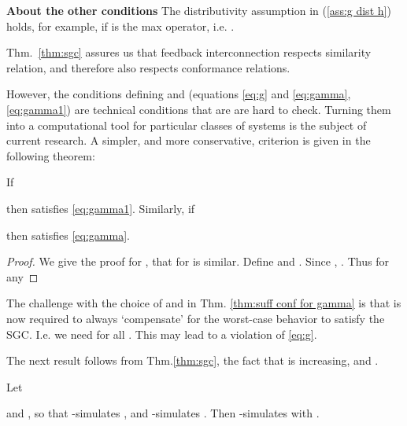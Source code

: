 \textbf{About the other conditions} The distributivity assumption in (\ref{ass:g dist h}) holds, for example, if  is the max operator, i.e. .

Thm.~\ref{thm:sgc} assures us that feedback interconnection respects similarity relation, and therefore also respects conformance relations.

However, the conditions defining  and  (equations \eqref{eq:g} and \eqref{eq:gamma},\eqref{eq:gamma1}) are technical conditions that are are hard to check. 
Turning them into a computational tool for particular classes of systems is the subject of current research.
A simpler, and more conservative, criterion is given in the following theorem:
\begin{theorem}
\label{thm:suff conf for gamma}
If 

then  satisfies \eqref{eq:gamma1}.
Similarly, if 

then  satisfies \eqref{eq:gamma}.
\exmend
\end{theorem}
\begin{proof}
	We give the proof for , that for  is similar.
	Define  
	and .
	Since , .
	Thus for any 
	
\end{proof}
The challenge with the choice of  and  in Thm. \ref{thm:suff conf for gamma} is that  is now required to always `compensate' for the worst-case behavior to satisfy the SGC. 
I.e. we need  for all .
This may lead to a violation of \eqref{eq:g}. 

The next result follows from Thm.\ref{thm:sgc}, the fact that  is increasing, and \cite[Thm. 3.6]{JuliusP_ApxSynchronizationMTS06}.
\begin{theorem}
Let 

and ,
so that  -simulates ,
and  -simulates .
Then  -simulates  with 
.
\end{theorem}



